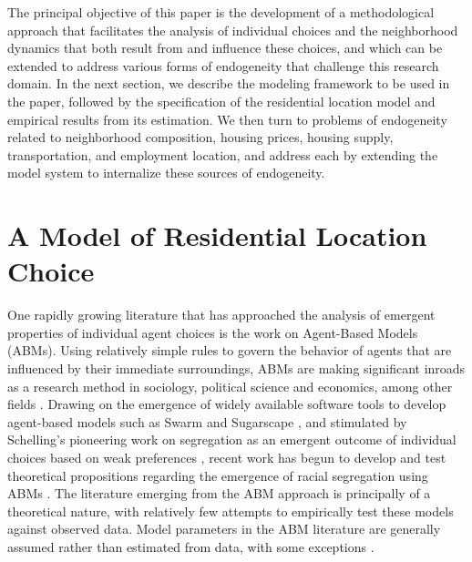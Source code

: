 \documentclass[12pt,a4paper]{article}
\begin{document}
The principal objective of this paper is the development of a
methodological approach that facilitates the analysis of
individual choices and the neighborhood dynamics that both result
from and influence these choices, and which can be extended to
address various forms of endogeneity that challenge this research
domain.  In the next section, we describe the modeling framework
to be used in the paper, followed by the specification of the
residential location model and empirical results from its
estimation.  We then turn to problems of endogeneity related to
neighborhood composition, housing prices, housing supply,
transportation, and employment location, and address each by
extending the model system to internalize these sources of
endogeneity.


\section{A Model of Residential Location Choice}

One rapidly growing literature that has approached the analysis of
emergent properties of individual agent choices is the work on
Agent-Based Models (ABMs). Using relatively simple rules to govern
the behavior of agents that are influenced by their immediate
surroundings, ABMs are making significant inroads as a research
method in sociology, political science and economics, among other
fields
\cite{epstein-book-1996,axelrod-book-1997,macy-ars-2002,tesfatsion-handbook-2003}.
Drawing on the emergence of widely available software tools to
develop agent-based models such as Swarm \cite{swarm-web} and
Sugarscape \cite{sugarscape-web}, and stimulated by Schelling's
pioneering work on segregation as an emergent outcome of individual
choices based on weak preferences
\cite{schelling-1969,schelling-1971}, recent work has begun to
develop and test theoretical propositions regarding the emergence of
racial segregation using ABMs 
\cite{bruch-working-2004,fossett-2006,zhang-jms-2004}. The
literature emerging from the ABM approach is principally of a
theoretical nature, with relatively few attempts to empirically test
these models against observed data. Model parameters in the ABM
literature are generally assumed rather than estimated from data,
with some exceptions \cite{bruch-working-2004}.
\end{document}
